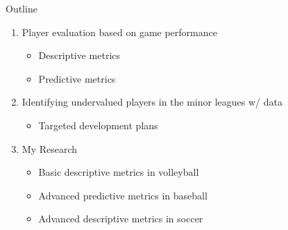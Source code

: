\documentclass{beamer}
\begin{document}
\begin{frame}{Outline}
  \begin{enumerate}
    \item Player evaluation based on game performance
    \begin{itemize} 
      \item Descriptive metrics
      \item Predictive metrics
    \end{itemize}
    \item {\color{gray} Identifying undervalued players in the minor leagues w/ data}
    \begin{itemize}
      \color{gray}
      \item Targeted development plans
    \end{itemize}
    \item {\color{gray} My Research}
    \begin{itemize}
      \color{gray}
      \item Basic descriptive metrics in volleyball
      \item Advanced predictive metrics in baseball
      \item Advanced descriptive metrics in soccer
    \end{itemize}
  \end{enumerate}
\end{frame}
\end{document}

